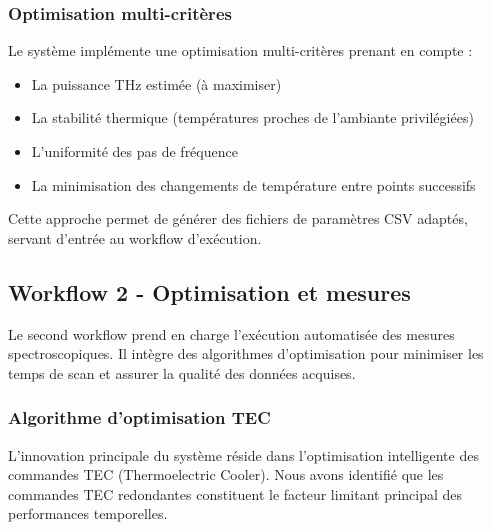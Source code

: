 \subsubsection{Optimisation multi-critères}

Le système implémente une optimisation multi-critères prenant en compte :
\begin{itemize}
\item La puissance THz estimée (à maximiser)
\item La stabilité thermique (températures proches de l'ambiante privilégiées)
\item L'uniformité des pas de fréquence
\item La minimisation des changements de température entre points successifs
\end{itemize}

Cette approche permet de générer des fichiers de paramètres CSV adaptés, servant d'entrée au workflow d'exécution.

\subsection{Workflow 2 - Optimisation et mesures}

Le second workflow prend en charge l'exécution automatisée des mesures spectroscopiques. Il intègre des algorithmes d'optimisation pour minimiser les temps de scan et assurer la qualité des données acquises.

\subsubsection{Algorithme d'optimisation TEC}

L'innovation principale du système réside dans l'optimisation intelligente des commandes TEC (Thermoelectric Cooler). Nous avons identifié que les commandes TEC redondantes constituent le facteur limitant principal des performances temporelles.

